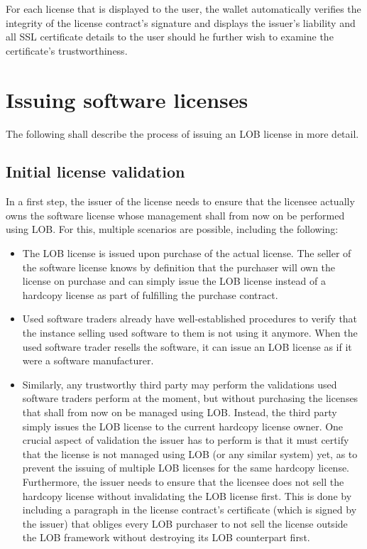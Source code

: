 \documentclass[a4paper]{article}
\begin{document}
For each license that is displayed to the user, the wallet automatically verifies the integrity of the license contract's signature and displays the issuer's liability and all SSL certificate details to the user should he further wish to examine the certificate's trustworthiness.





\section{Issuing software licenses}
\label{ch:issuingSoftwareLicenses}

The following shall describe the process of issuing an LOB license in more detail. 

\subsection{Initial license validation}

In a first step, the issuer of the license needs to ensure that the licensee actually owns the software license whose management shall from now on be performed using LOB. For this, multiple scenarios are possible, including the following:
\begin{itemize}
  \item The LOB license is issued upon purchase of the actual license. The seller of the software license knows by definition that the purchaser will own the license on purchase and can simply issue the LOB license instead of a hardcopy license as part of fulfilling the purchase contract.

  \item Used software traders already have well-established procedures to verify that the instance selling used software to them is not using it anymore. When the used software trader resells the software, it can issue an LOB license as if it were a software manufacturer.

  \item Similarly, any trustworthy third party may perform the validations used software traders perform at the moment, but without purchasing the licenses that shall from now on be managed using LOB. Instead, the third party simply issues the LOB license to the current hardcopy license owner. One crucial aspect of validation the issuer has to perform is that it must certify that the license is not managed using LOB (or any similar system) yet, as to prevent the issuing of multiple LOB licenses for the same hardcopy license. Furthermore, the issuer needs to ensure that the licensee does not sell the hardcopy license without invalidating the LOB license first. This is done by including a paragraph in the license contract's certificate (which is signed by the issuer) that obliges every LOB purchaser to not sell the license outside the LOB framework without destroying its LOB counterpart first.
\end{itemize}
\end{document}
